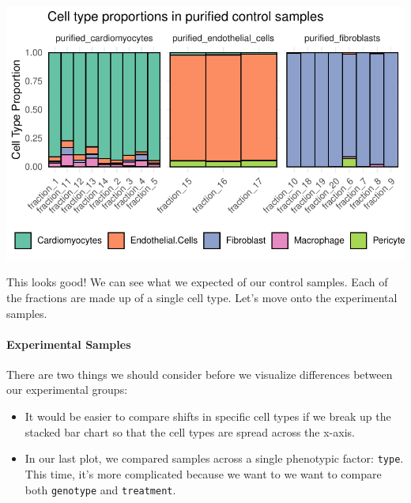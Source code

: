 \documentclass[
  letterpaper,
  DIV=11,
  numbers=noendperiod]{scrreprt}
\let\oldparagraph\paragraph
\renewcommand{\paragraph}[1]{\oldparagraph{#1}\mbox{}}
\providecommand{\tightlist}{%
  \setlength{\itemsep}{0pt}\setlength{\parskip}{0pt}}\usepackage{longtable,booktabs,array}
\begin{document}
\includegraphics{scripts/03_dataWrangling/class6_files/figure-pdf/unnamed-chunk-12-1.pdf}

This looks good! We can see what we expected of our control samples.
Each of the fractions are made up of a single cell type. Let's move onto
the experimental samples.

\paragraph{Experimental Samples}\label{experimental-samples}

There are two things we should consider before we visualize differences
between our experimental groups:

\begin{itemize}
\tightlist
\item
  It would be easier to compare shifts in specific cell types if we
  break up the stacked bar chart so that the cell types are spread
  across the x-axis.
\item
  In our last plot, we compared samples across a single phenotypic
  factor: \texttt{type}. This time, it's more complicated because we
  want to we want to compare both \texttt{genotype} and
  \texttt{treatment}.
\end{itemize}
\end{document}

